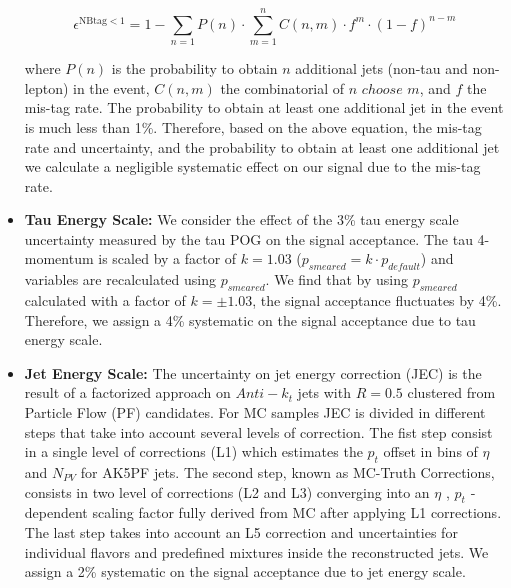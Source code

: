 \begin{itemize}
	\begin{equation}\label{eq:nttbar}
	\epsilon^{\textrm{NBtag} < 1} = 1 - \sum_{n=1} P(n) \cdot \sum_{m=1}^{n} C(n,m) \cdot f^{m} \cdot (1-f)^{n-m}
	\end{equation}
	
	where $P(n)$ is the probability to obtain $n$ additional jets (non-tau and non-lepton) in the event, $C(n,m)$ the combinatorial of $n$ $choose$ $m$, and $f$ the mis-tag rate. The probability to obtain at least one additional jet in the event is much less than 1\%. Therefore, based on the above equation, the mis-tag rate and uncertainty, and the probability to obtain at least one additional jet we calculate a negligible systematic effect on our signal due to the mis-tag rate.
	
	\item \textbf{Tau Energy Scale:} We consider the effect of the 3\% tau energy scale uncertainty measured by the tau POG on the signal acceptance. The tau 4-momentum is scaled by a factor of $k=1.03$ ($p_{smeared} = k \cdot p_{default}$) and variables are recalculated using $p_{smeared}$. We find that by using $p_{smeared}$ calculated with a factor of $k=\pm 1.03$, the signal acceptance fluctuates by 4\%. Therefore, we assign a 4\% systematic on the signal acceptance due to tau energy scale.
	\item \textbf{Jet Energy Scale:}  The uncertainty on jet energy correction (JEC) is the result of a factorized approach on $Anti­-k_{t}$ jets with $R=0.5$ clustered from Particle Flow (PF) candidates. For MC samples JEC is divided in different steps that take into account several levels of correction. The fist step consist in a single level of corrections (L1) which estimates the $p_{t}$ offset in bins of $\eta$ and $N_{PV}$ for AK5PF jets. The second step, known as MC-Truth Corrections, consists in two level of corrections (L2 and L3) converging into an $\eta$ , $p_{t}$ ­dependent scaling factor fully derived from MC after applying L1­ corrections. The last step takes into account an L5 correction and uncertainties for individual flavors and predefined mixtures inside the reconstructed jets. We assign a 2\% systematic on the signal acceptance due to jet energy scale.

\end{itemize}
